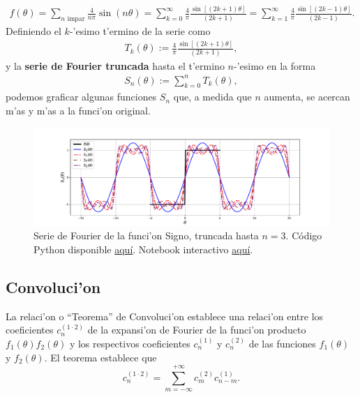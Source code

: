 \begin{align}
f(\theta)=\sum_{n\text{ impar}}\frac{4}{n\pi}\sin(n\theta)=\sum_{k=0}^{\infty}\frac{4}{\pi}\frac{\sin[(2k+1)\theta]}{(2k+1)}=\sum_{k=1}^{\infty}\frac{4}{\pi}\frac{\sin[(2k-1)\theta]}{(2k-1)}.
\end{align}
Definiendo el $k$-'esimo t'ermino de la serie como 
\begin{align}
T_{k}(\theta):=\frac{4}{\pi}\frac{\sin[(2k+1)\theta]}{(2k+1)},
\end{align}
y la \textbf{serie de Fourier truncada} hasta el t'ermino $n$-'esimo en la forma
\begin{align}
S_n(\theta):=\sum_{k=0}^n T_{k}(\theta),
\end{align}
podemos graficar algunas funciones $S_n$ que, a medida que $n$ aumenta, se acercan m'as y m'as a la funci'on original.
\begin{figure}[h]
\centering
\includegraphics[scale=0.4]{figs/fig-Fourier-serie-signo.pdf}
\caption{Serie de Fourier de la funci'on Signo, truncada hasta $n=3$. Código Python disponible \href{https://github.com/gfrubi/FM2/blob/master/figuras-editables/fig-Fourier-serie-signo.py}{aquí}. Notebook interactivo \href{https://github.com/gfrubi/FM2/blob/master/Notebooks/Ejemplo-Serie-Fourier-Funcion-Signo.ipynb}{aquí}.}
\label{im:signo}
\end{figure}

\subsection{Convoluci'on}

La relaci'on o ``Teorema'' de Convoluci'on establece una relaci'on entre los coeficientes $c_{n}^{(1\cdot 2)}$ de la expansi'on de Fourier de la funci'on producto $f_1(\theta)f_2(\theta)$ y los respectivos coeficientes $c_{n}^{(1)}$ y $c_{n}^{(2)}$ de las funciones $f_1(\theta)$ y $f_2(\theta)$. El teorema establece que
\begin{equation}\label{conv}
\boxed{c_n^{(1\cdot 2)} = \sum_{m=-\infty}^{+\infty} c_m^{(2)}c_{n-m}^{(1)}.}
\end{equation}

